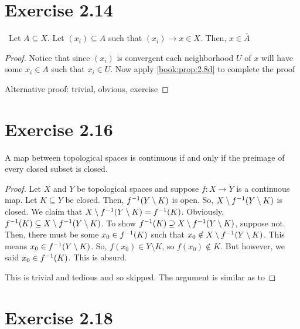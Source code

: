 \documentclass{article}
\newcommand*{\cl}[1]{\overline{#1}}
\begin{document}
\section{Exercise 2.14}
\begin{proposition}
    \topospace \, Let $A \subseteq X$. Let $(x_i) \subseteq A$
    such that $(x_i) \to x \in X$. Then, $x \in \cl{A}$
\end{proposition}

\begin{proof}
     Notice that since $(x_i)$ is convergent each
    neighborhood $U$ of $x$ will have some $x_i \in A$ such that $x_i \in U$.
    Now apply \cref{book:prop:2.8d} to complete the proof

    Alternative proof: trivial, obvious, exercise
\end{proof}

\section{Exercise 2.16}

\begin{proposition}
\label{book:prop:2.15}
A map between topological spaces is continuous if and only if the preimage of every closed subset is closed.
\end{proposition}

\begin{proof}
    \forwarddir Let $X$ and $Y$ be topological spaces and suppose $f: X \to Y$ is a continuous map.
    Let $K \subseteq Y$ be closed. Then, $f^{-1}(Y \setminus K)$
    is open. So, $X \setminus f^{-1}(Y \setminus K)$ is closed.
    We claim that $X \setminus f^{-1}(Y \setminus K) = f^{-1}(K)$. Obviously, $f^{-1}(K) \subseteq X \setminus f^{-1}(Y \setminus K)$.
    To show $f^{-1}(K) \supseteq X \setminus f^{-1}(Y \setminus K)$, suppose not. Then, there must be some $x_0 \in f^{-1}(K)$ such that $x_0 \notin X \setminus f^{-1}(Y \setminus K)$. This means $x_0 \in f^{-1}(Y\setminus K)$.
    So, $f(x_0) \in Y \setminus K$, so $f(x_0) \notin K$.
    But however, we said $x_0 \in f^{-1}(K)$. This is absurd.

    \conversedir This is trivial and tedious and so skipped.
    The argument is similar as to \forwarddir
    
\end{proof}

\section{Exercise 2.18}
\end{document}
